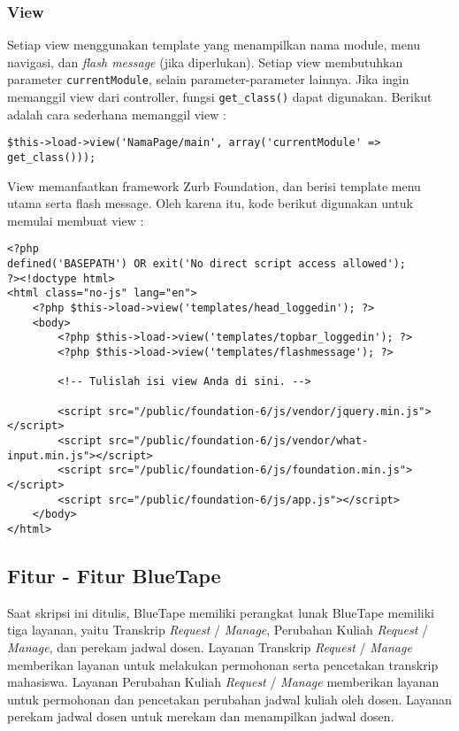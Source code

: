 \subsubsection{View}
	Setiap view menggunakan template yang menampilkan nama module, menu navigasi, dan \textit{flash message} (jika diperlukan). Setiap view membutuhkan parameter \texttt{currentModule}, selain parameter-parameter lainnya. Jika ingin memanggil view dari controller, fungsi \texttt{get\_class()} dapat digunakan. Berikut adalah cara sederhana memanggil view :  
\begin{lstlisting}
$this->load->view('NamaPage/main', array('currentModule' => get_class()));
\end{lstlisting}

	View memanfaatkan framework Zurb Foundation, dan berisi template menu utama serta flash message. Oleh karena itu, kode berikut digunakan untuk memulai membuat view :
\begin{lstlisting}
<?php
defined('BASEPATH') OR exit('No direct script access allowed');
?><!doctype html>
<html class="no-js" lang="en">
    <?php $this->load->view('templates/head_loggedin'); ?>
    <body>
        <?php $this->load->view('templates/topbar_loggedin'); ?>
        <?php $this->load->view('templates/flashmessage'); ?>

        <!-- Tulislah isi view Anda di sini. -->

        <script src="/public/foundation-6/js/vendor/jquery.min.js"></script>
        <script src="/public/foundation-6/js/vendor/what-input.min.js"></script>
        <script src="/public/foundation-6/js/foundation.min.js"></script>
        <script src="/public/foundation-6/js/app.js"></script>
    </body>
</html>
\end{lstlisting}

\subsection{Fitur - Fitur BlueTape}
	Saat skripsi ini ditulis, BlueTape memiliki perangkat lunak BlueTape memiliki tiga layanan, yaitu Transkrip \textit{Request} / \textit{Manage}, Perubahan Kuliah \textit{Request} / \textit{Manage}, dan perekam jadwal dosen. Layanan Transkrip \textit{Request} / \textit{Manage} memberikan layanan untuk melakukan permohonan serta pencetakan transkrip mahasiswa. Layanan Perubahan Kuliah \textit{Request} / \textit{Manage} memberikan layanan untuk permohonan dan pencetakan perubahan jadwal kuliah oleh dosen. Layanan perekam jadwal dosen untuk merekam dan menampilkan jadwal dosen.

